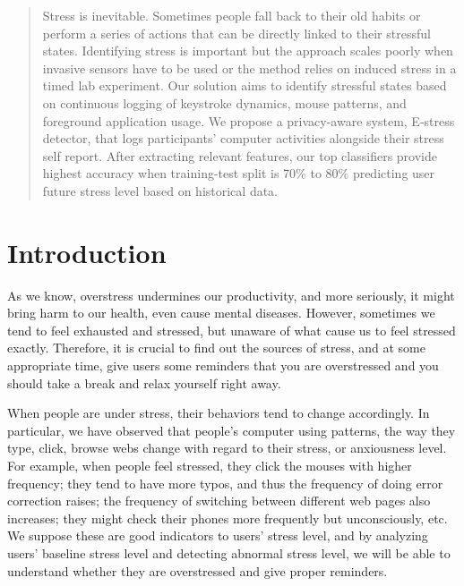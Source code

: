 \documentclass{article}
\begin{document}
 


\begin{abstract} 
Stress is inevitable. Sometimes people fall back to their old habits or perform a series of actions that can be directly linked to their stressful states. Identifying stress is important but the approach scales poorly when invasive sensors have to be used or the method relies on induced stress in a timed lab experiment.  Our solution aims to identify stressful states based on continuous logging of keystroke dynamics, mouse patterns, and foreground application usage. We propose a privacy-aware system, E-stress detector, that logs participants' computer activities alongside their stress self report. After extracting relevant features, our top classifiers provide highest accuracy when training-test split is 70\% to 80\% predicting user future stress level based on historical data. 
\end{abstract} 

\section{Introduction}
\label{introduction}

As we know, overstress undermines our productivity, and more seriously, it might bring harm to our health, even cause mental diseases. However, sometimes we tend to feel exhausted and stressed, but unaware of what cause us to feel stressed exactly. Therefore, it is crucial to find out the sources of stress, and at some appropriate time, give  users some reminders that you are overstressed and you should take a break and relax yourself right away.

When people are under stress, their behaviors tend to change accordingly. In particular, we have observed that people’s computer using patterns, the way they type, click, browse webs change with regard to their stress, or anxiousness level. For example, when people feel stressed, they click the mouses with higher frequency; they tend to have more typos, and thus the frequency of doing error correction raises; the frequency of switching between different web pages also increases; they might check their phones more frequently but unconsciously, etc. We suppose these are good indicators to users’ stress level, and by analyzing users’ baseline stress level and detecting abnormal stress level, we will be able to understand whether they are overstressed and give proper reminders.
\end{document}
